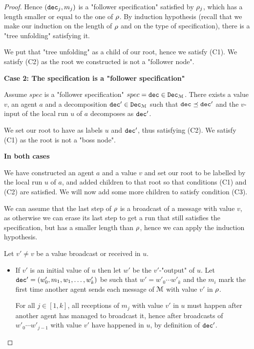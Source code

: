 \begin{proof}
	Hence $(\mathtt{dec}_j, m_j)$ is a "follower specification" satisfied by $\rho_j$, which has a length smaller or equal to the one of $\rho$. By induction hypothesis (recall that we make our induction on the length of $\rho$ and on the type of specification), there is a "tree unfolding" satisfying it.
	
	We put that "tree unfolding" as a child of our root, hence we satisfy (C1). We satisfy (C2) as the root we constructed is not a "follower node".
	
	\textbf{Case 2: The specification is a "follower specification"} 
	
	Assume $spec$ is a "follower specification" $spec = \mathtt{dec} \in \mathtt{Dec}_{\mathcal{M}}$. 
	There exists a value $v$, an agent $a$ and a decomposition $\mathtt{dec}' \in \mathtt{Dec}_{\mathcal{M}}$ such that $\mathtt{dec} \preceq \mathtt{dec}'$ and the $v$-input of the local run $u$ of $a$ decomposes as $\mathtt{dec}'$. 
	
	We set our root to have as labels $u$ and $\mathtt{dec}'$, thus satisfying (C2). We satisfy (C1) as the root is not a "boss node".
	
	\textbf{In both cases}
	
	We have constructed an agent $a$ and a value $v$ and set our root to be labelled by the local run $u$ of $a$, and added children to that root so that conditions (C1) and (C2) are satisfied. We will now add some more children to satisfy condition (C3).
	
	We can assume that the last step of $\rho$ is a broadcast of a message with value $v$, as otherwise we can erase its last step to get a run that still satisfies the specification, but has a smaller length than $\rho$, hence we can apply the induction hypothesis.
	
	Let $v' \neq v$ be a value broadcast or received in $u$. 
	
	\begin{itemize}
		\item If $v'$ is an initial value of $u$ then let $w'$ be the $v'$-"output" of $u$. Let $\mathtt{dec}' = (w'_0, m_1, w_1, \ldots, w'_k)$ be such that $w' = w'_0 \cdots w'_k$ and the $m_i$ mark the first time another agent sends each message of $\mathcal{M}$ with value $v'$ in $\rho$.  
		
		For all $j \in [1,k]$, all receptions of $m_j$ with value $v'$ in $u$ must happen after another agent has managed to broadcast it, hence after broadcasts of $w'_0 \cdots w'_{j-1}$ with value $v'$ have happened in $u$, by definition of $\mathtt{dec}'$.
		

\end{itemize}
\end{proof}
